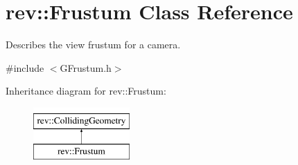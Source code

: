 \hypertarget{classrev_1_1_frustum}{}\section{rev\+::Frustum Class Reference}
\label{classrev_1_1_frustum}


Describes the view frustum for a camera.  




{\ttfamily \#include $<$G\+Frustum.\+h$>$}

Inheritance diagram for rev\+::Frustum\+:\begin{figure}[H]
\begin{center}
\leavevmode
\includegraphics[height=2.000000cm]{classrev_1_1_frustum}
\end{center}
\end{figure}
